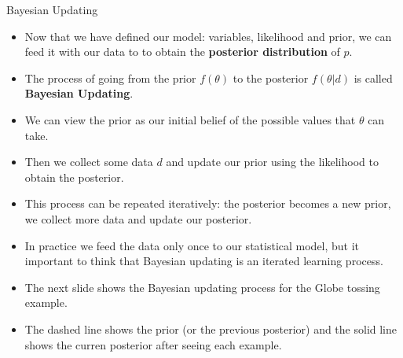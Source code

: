 \documentclass[handout]{beamer}
\begin{document}
\begin{frame}{Bayesian Updating}
\scriptsize{

\begin{itemize}
\item Now that we have defined our model: variables, likelihood and prior, we can feed it with our data to  to obtain the \textbf{posterior distribution} of $p$.
\item The process of going from the prior $f(\theta)$ to the posterior $f(\theta|d)$ is called \textbf{Bayesian Updating}.
\item We can view the prior as our initial belief of the possible values that $\theta$ can take.
\item Then we collect some data $d$ and update our prior using the likelihood to obtain the posterior.
\item This process can be repeated iteratively: the posterior becomes a new prior, we collect more data and update our posterior.
\item In practice we feed the data only once to our statistical model, but it important to think that Bayesian updating is an iterated learning process.
\item The next slide shows the Bayesian updating process for the Globe tossing example.
\item The dashed line shows the prior (or the previous posterior) and the solid line shows the curren posterior after seeing each example.
\end{itemize}

} 

\end{frame}
\end{document}
